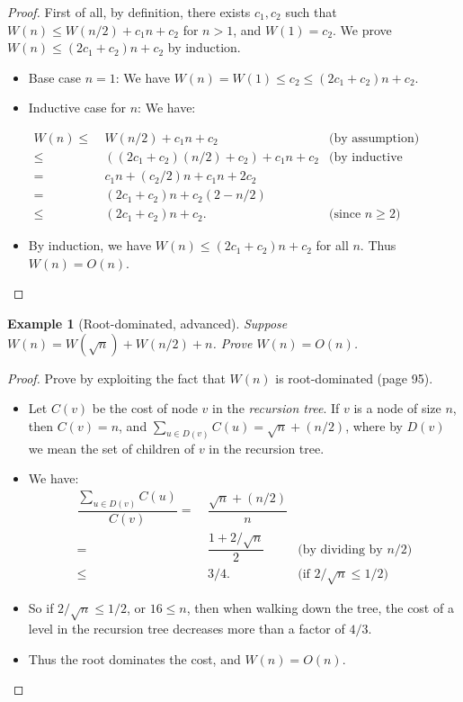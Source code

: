 \documentclass[11pt,a4paper,oneside,microtype,nokorean]{oblivoir}
\newtheorem{example}{Example}
\begin{document}
\begin{proof}
  First of all, by definition, there exists $c_1,c_2$ such that $W(n) \le W(n/2) + c_1 n + c_2$ for
  $n > 1$, and $W(1) = c_2$.  We prove $W(n) \le (2 c_1 + c_2) n + c_2$ by induction.

  \begin{itemize}
  \item Base case $n=1$: We have $W(n) = W(1) \le c_2 \le (2 c_1 + c_2) n + c_2$.

  \item Inductive case for $n$: We have:

    \begin{align*}
      W(n)
      \le &~ W(n/2) + c_1 n + c_2 & \mbox{(by assumption)} \\
      \le &~ ((2 c_1 + c_2) (n/2) + c_2) + c_1 n + c_2 & \mbox{(by inductive hypothesis)} \\
      = &~ c_1 n + (c_2 / 2) n + c_1 n + 2 c_2 \\
      = &~ (2 c_1 + c_2)n + c_2 (2 - n/2) \\
      \le &~ (2 c_1 + c_2)n + c_2. & \mbox{(since $n \ge 2$)}
    \end{align*}

  \item By induction, we have $W(n) \le (2 c_1 + c_2) n + c_2$ for all $n$.  Thus $W(n) = O(n)$.
  \end{itemize}
\end{proof}

\begin{example}[Root-dominated, advanced] Suppose $W(n) = W(\sqrt{n}) + W(n/2) + n$.  Prove
  $W(n) = O(n)$.
\end{example}


\begin{proof}
  Prove by exploiting the fact that $W(n)$ is root-dominated (page 95).

  \begin{itemize}
  \item Let $C(v)$ be the cost of node $v$ in the \emph{recursion tree}.  If $v$ is a node of size
    $n$, then $C(v) = n$, and $\sum_{u \in D(v)} C(u) = \sqrt{n} + (n/2)$, where by $D(v)$ we mean
    the set of children of $v$ in the recursion tree.
  \item We have:
    \begin{align*}
      \dfrac{\sum_{u \in D(v)} C(u)}{C(v)}
      = &~ \dfrac{\sqrt{n} + (n/2)}{n} \\
      = &~ \dfrac{1 + 2/\sqrt{n}}{2} & \mbox{(by dividing by $n/2$)} \\
      \le &~ 3/4. & \mbox{(if $2/\sqrt{n} \le 1/2$)}
    \end{align*}
  \item So if $2/\sqrt{n} \le 1/2$, or $16 \le n$, then when walking down the tree, the cost of a
    level in the recursion tree decreases more than a factor of $4/3$.
  \item Thus the root dominates the cost, and $W(n) = O(n)$.
  \end{itemize}
\end{proof}
\end{document}
